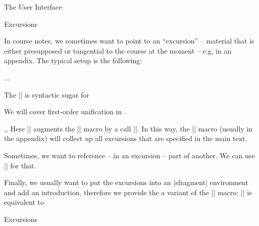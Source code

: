 \begin{sfragment}[id=sec:user]{The User Interface}
\begin{sfragment}[id=sec:user:excursions]{Excursions}

  In course notes, we sometimes want to point to an ``excursion'' -- material that is
  either presupposed or tangential to the course at the moment -- e.g. in an appendix. The
  typical setup is the following:

\begin{latexcode}
...
\begin{appendix}\printexcursions\end{appendix}
\end{latexcode}

\begin{function}{\excursion}
  The || is syntactic sugar for

\begin{latexcode}
\begin{nparagraph}[title=Excursion]
  We will cover first-order unification in .
\end{nparagraph}
\end{latexcode}
\end{function}

\begin{function}{\activateexcursion,\printexcursion,\excursionref}
  Here || augments the |\printexcursions| macro by a call
  ||. In this way, the |\printexcursions| macro (usually in the
  appendix) will collect up all excursions that are specified in the main text.

  Sometimes, we want to reference -- in an excursion -- part of another. We can use
  || for that.
\end{function}

\begin{function}{\excursiongroup}
  Finally, we usually want to put the excursions into an |sfragment| environment and add
  an introduction, therefore we provide the a variant of the |\printexcursions| macro:
  |\excursiongroup[id=|\meta{id}|,intro=|\meta{path}|]| is equivalent to
\begin{latexcode}
\begin{note}
\begin{sfragment}[id=<id>]{Excursions}
  \printexcursions
\end{sfragment}
\end{note}
\end{latexcode}
\end{function}
\end{sfragment}


\end{sfragment}

